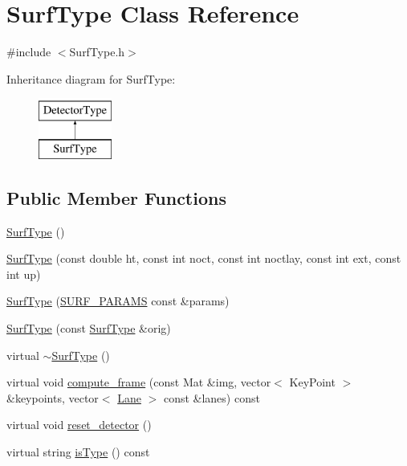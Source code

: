 \hypertarget{class_surf_type}{
\section{\-Surf\-Type \-Class \-Reference}
\label{class_surf_type}
}


{\ttfamily \#include $<$\-Surf\-Type.\-h$>$}

\-Inheritance diagram for \-Surf\-Type\-:\begin{figure}[H]
\begin{center}
\leavevmode
\includegraphics[height=2.000000cm]{class_surf_type}
\end{center}
\end{figure}
\subsection*{\-Public \-Member \-Functions}
\begin{DoxyCompactItemize}
\item 
\hyperlink{class_surf_type_a80ca7aa3ad82c03decc277897750c81e}{\-Surf\-Type} ()
\item 
\hyperlink{class_surf_type_a7480fca87f8d4587c74d7509d5a2b7c0}{\-Surf\-Type} (const double ht, const int noct, const int noctlay, const int ext, const int up)
\item 
\hyperlink{class_surf_type_a47295e6b321f4b52388d6597ec005036}{\-Surf\-Type} (\hyperlink{class_s_u_r_f___p_a_r_a_m_s}{\-S\-U\-R\-F\-\_\-\-P\-A\-R\-A\-M\-S} const \&params)
\item 
\hyperlink{class_surf_type_aef8d1238dba6f3c84e5f99b9bcaa624b}{\-Surf\-Type} (const \hyperlink{class_surf_type}{\-Surf\-Type} \&orig)
\item 
virtual \hyperlink{class_surf_type_abf1d4b853f3c139f080a9f9c0e0c24f7}{$\sim$\-Surf\-Type} ()
\item 
virtual void \hyperlink{class_surf_type_a1acaf574d9ea2aeaac266a3b73ec4416}{compute\-\_\-frame} (const \-Mat \&img, vector$<$ \-Key\-Point $>$ \&keypoints, vector$<$ \hyperlink{class_lane}{\-Lane} $>$ const \&lanes) const 
\item 
virtual void \hyperlink{class_surf_type_a0385dc741fabe0e8e2f5f2171f8807d6}{reset\-\_\-detector} ()
\item 
virtual string \hyperlink{class_detector_type_a2a8cfc2d84b8dbade17548be48d1498f}{is\-Type} () const 
\end{DoxyCompactItemize}
